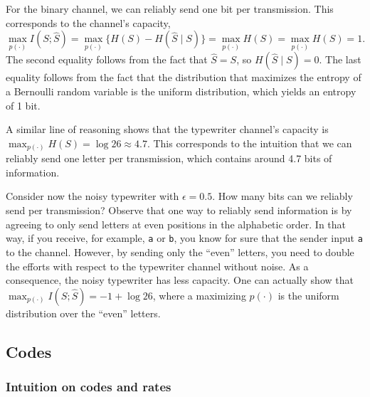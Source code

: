 \begin{example}
For the binary channel, we can reliably send one bit per transmission. This corresponds to the channel's capacity,
%
$$\max_{p(\cdot)} I(S; \hat{S}) = \max_{p(\cdot)} \{ H(S) - H(\hat{S} \mid S) \} = \max_{p(\cdot)} H(S) = \max_{p(\cdot)} H(S) = 1.$$
%
The second equality follows from the fact that $\hat{S} = S$, so $H(\hat{S} \mid S) = 0$. The last equality follows from the fact that the distribution that maximizes the entropy of a Bernoulli random variable is the uniform distribution, which yields an entropy of 1 bit.
\end{example}

\begin{example}
A similar line of reasoning shows that the typewriter channel's capacity is $\max_{p(\cdot)} H(S) = \log 26 \approx 4.7$. This corresponds to the intuition that we can reliably send one letter per transmission, which contains around 4.7 bits of information.
\end{example}

\begin{example}
Consider now the noisy typewriter with $\epsilon = 0.5$. How many bits can we reliably send per transmission? Observe that one way to reliably send information is by agreeing to only send letters at even positions in the alphabetic order. In that way, if you receive, for example, \texttt{a} or \texttt{b}, you know for sure that the sender input \texttt{a} to the channel. However, by sending only the ``even'' letters, you need to double the efforts with respect to the typewriter channel without noise. As a consequence, the noisy typewriter has less capacity. One can actually show that $\max_{p(\cdot)} I(S; \hat{S}) = -1 + \log 26$, where a maximizing $p(\cdot)$ is the uniform distribution over the ``even'' letters.
\end{example}

\subsection{Codes}

\subsubsection*{Intuition on codes and rates}


